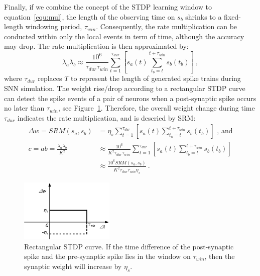 Finally, if we combine the concept of the STDP learning window to equation~\ref{equ:mul}, the length of the observing time on $s_b$ shrinks to a fixed-length windowing period, $\tau_{win}$.
Consequently, the rate multiplication can be conducted within only the local events in term of time, although the accuracy may drop.
The rate multiplication is then approximated by:
\begin{equation}
\lambda_a \lambda_b \approx \frac{10^6}{\tau_{dur} \tau_{win}} \sum_{t=1}^{\tau_{dur}} [s_a(t) \sum_{t_b=t}^{t+\tau_{win}} s_b(t_b)]~,
\end{equation} 
where $\tau_{dur}$ replaces $T$ to represent the length of generated spike trains during SNN simulation.
The weight rise/drop according to a rectangular STDP curve can detect the spike events of a pair of neurons when a post-synaptic spike occurs no later than $\tau_{win}$, see Figure~\ref{fig:rtg_stdp}.
Therefore, the overall weight change during time $\tau_{dur}$ indicates the rate multiplication, and is descried by SRM:
\begin{equation}
\begin{aligned}
\Delta w = SRM(s_a, s_b) &= \eta_s \sum_{t=1}^{\tau_{dur}} [s_a(t) \sum_{t_b=t}^{t+\tau_{win}} s_b(t_b)] \text{~,~and}\\
c=ab=\frac{\lambda_a \lambda_b}{K^2} &\approx \frac{10^6}{K^2 \tau_{dur} \tau_{win}} \sum_{t=1}^{\tau_{dur}} [s_a(t) \sum_{t_b=t}^{t+\tau_{win}} s_b(t_b)] \\
&\approx  \frac{10^6 SRM(s_a, s_b)}{K^2 \tau_{dur} \tau_{win}  \eta_s}~.
\end{aligned}
\label{equ:srm}
\end{equation} 
\begin{figure}
	\centering
	\includegraphics[width=0.4\textwidth]{pics_sdlm/stdp.pdf}
	\caption{Rectangular STDP curve.
		If the time difference of the post-synaptic spike and the pre-synaptic spike lies in the window on $\tau_{win}$, then the synaptic weight will increase by $\eta_s$.}
	\label{fig:rtg_stdp}
\end{figure}

